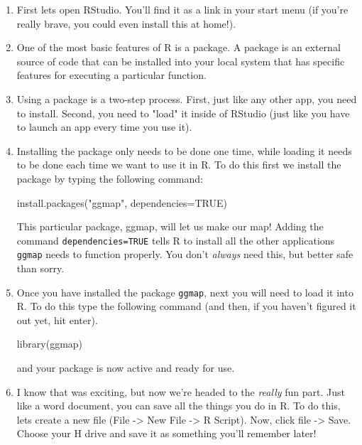 \documentclass{article}
\newenvironment{Schunk}{}{}
\newcommand{\code}[1]{\texttt{#1}}
\newcommand{\pkg}[1]{\mbox{\texttt{#1}}}
\newcommand{\proglang}[1]{\textsf{#1}}
\begin{document}
\begin{enumerate}[leftmargin=15mm]

\item First lets open \proglang{RStudio}.  You'll find it as a link in your start menu (if you're really brave, you could even install this at home!).

\item One of the most basic features of R is a package.  A package is an external source of code that can be installed into your local system that has specific features for executing a particular function.  

\item Using a package is a two-step process.  First, just like any other app, you need to install.  Second, you need to "load" it inside of RStudio (just like you have to launch an app every time you use it).

\item Installing the package only needs to be done one time, while loading it needs to be done each time we want to use it in \proglang{R}.  To do this first we install the package by typing the following command:

\begin{Schunk}
\begin{Sinput}
install.packages("ggmap", dependencies=TRUE)
\end{Sinput}
\end{Schunk}

This particular package, ggmap, will let us make our map!  Adding the command \code{dependencies=TRUE} tells \proglang{R} to install all the other applications \pkg{ggmap} needs to function properly.  You don't \textit{always} need this, but better safe than sorry.

\item Once you have installed the package \pkg{ggmap}, next you will need to load it into \proglang{R}. To do this type the following command (and then, if you haven't figured it out yet, hit enter).

\begin{Schunk}
\begin{Sinput}
library(ggmap)
\end{Sinput}
\end{Schunk}

and your package is now active and ready for use.

\item I know that was exciting, but now we're headed to the \textit{really} fun part. Just like a word document, you can save all the things you do in R.  To do this, lets create a new file (File -> New File -> R Script).  Now, click file -> Save.  Choose your H drive and save it as something you'll remember later!


\end{enumerate}
\end{document}
